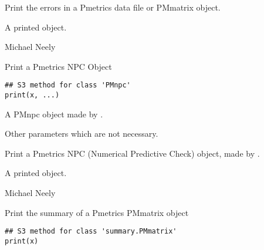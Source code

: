 \documentclass[a4paper]{book}
\begin{document}
%
\begin{Details}\relax
Print the errors in a Pmetrics data file or PMmatrix object.
\end{Details}
%
\begin{Value}
A printed object.
\end{Value}
%
\begin{Author}\relax
Michael Neely
\end{Author}
%
\begin{SeeAlso}\relax
{}
\end{SeeAlso}
%
\begin{Description}\relax
Print a Pmetrics NPC Object
\end{Description}
%
\begin{Usage}
\begin{verbatim}
## S3 method for class 'PMnpc'
print(x, ...)
\end{verbatim}
\end{Usage}
%
\begin{Arguments}
\begin{ldescription}
\item[\code{x}] A PMnpc object made by .

\item[\code{...}] Other parameters which are not necessary.
\end{ldescription}
\end{Arguments}
%
\begin{Details}\relax
Print a Pmetrics NPC (Numerical Predictive Check) object, made by .
\end{Details}
%
\begin{Value}
A printed object.
\end{Value}
%
\begin{Author}\relax
Michael Neely
\end{Author}
%
\begin{SeeAlso}\relax
{}
\end{SeeAlso}
%
\begin{Description}\relax
Print the summary of a Pmetrics PMmatrix object
\end{Description}
%
\begin{Usage}
\begin{verbatim}
## S3 method for class 'summary.PMmatrix'
print(x)
\end{verbatim}
\end{Usage}
\end{document}
